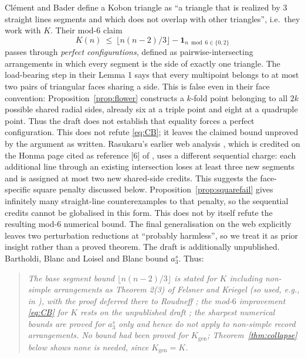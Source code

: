 \documentclass[11pt]{article}
\theoremstyle{definition}
\newcommand{\Kgen}{K_{\mathrm{gen}}}
\begin{document}
Clément and Bader \cite{CB2007} define a Kobon triangle as ``a triangle that
is realized by 3 straight lines segments and which does not overlap with
other triangles'', i.e.\ they work with $K$. Their mod-$6$ claim
\begin{equation}\label{eq:CB}
 K(n)\ \le\ \lfloor n(n-2)/3\rfloor - \mathbf 1_{n \bmod 6\in\{0,2\}}
\end{equation}
passes through \emph{perfect configurations}, defined as pairwise-intersecting
arrangements in which every segment is the side of exactly one triangle.
The load-bearing step in their Lemma 1 says that every multipoint belongs to
at most two pairs of triangular faces sharing a side. This is false even in
their face convention: Proposition~\ref{prop:flower} constructs a $k$-fold
point belonging to all $2k$ possible shared radial sides, already six at a
triple point and eight at a quadruple point. Thus the draft does not establish
that equality forces a perfect configuration. This does not refute
\eqref{eq:CB}; it leaves the claimed bound unproved by the argument as written.
Rasukaru's earlier web analysis \cite{Rasukaru2005}, which is credited on the
Honma page cited as reference [6] of \cite{CB2007}, uses a different
sequential charge: each additional line through an existing intersection
loses at least three new segments and is assigned at most two new shared-side
credits. This suggests the face-specific square penalty discussed below.
Proposition~\ref{prop:squarefail} gives infinitely many straight-line
counterexamples to that penalty, so the sequential credits cannot be
globalised in this form. This does not by itself refute the resulting
mod-$6$ numerical bound. The final generalisation on the web explicitly
leaves two perturbation reductions at ``probably harmless'', so we treat it
as prior insight rather than a proved theorem.
The draft is additionally unpublished. Bartholdi, Blanc and Loisel
\cite{BBL} and Blanc \cite{Blanc} bound $a_3^s$. Thus:

\begin{quote}
\emph{The base segment bound $\lfloor n(n-2)/3\rfloor$ is stated for $K$
including non-simple arrangements as Theorem 2(3) of Felsner and Kriegel
\cite{FK1999} (so used, e.g., in \cite{PU1}), with the proof deferred there
to Roudneff \cite{Rou1996}; the mod-$6$ improvement
\eqref{eq:CB} for $K$ rests on the unpublished draft \cite{CB2007}; the
sharpest numerical bounds \cite{BBL,Blanc} are proved for $a_3^s$ only and
hence do not apply to non-simple record arrangements. No bound had been
proved for $\Kgen$; Theorem~\ref{thm:collapse} below shows none is needed,
since $\Kgen=K$.}
\end{quote}
\end{document}
